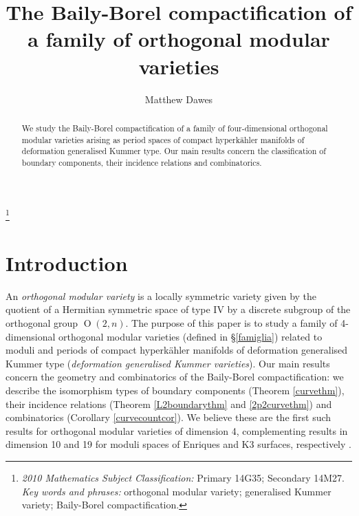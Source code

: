 \documentclass[11pt]{article}
\title{The Baily-Borel compactification of a family of orthogonal modular varieties}
\author{Matthew Dawes}
\date{}
\newcommand{\opn}{\operatorname}
\begin{document}
\maketitle
\def\thefootnote{}
\footnote{\textit{2010 Mathematics Subject Classification:}
Primary 14G35; Secondary 14M27. \\
\textit{Key words and phrases:}
orthogonal modular variety; generalised Kummer variety; Baily-Borel compactification.}
\begin{abstract}
  We study the Baily-Borel compactification of a family of four-dimensional orthogonal modular varieties
  arising as period spaces of compact hyperk\"ahler manifolds of deformation generalised Kummer type.
  Our main results concern the classification of boundary components, their incidence relations and combinatorics.
\end{abstract}
\section{Introduction}
An \emph{orthogonal modular variety} is a locally symmetric variety
given by the quotient of a Hermitian symmetric space of type IV by a discrete subgroup of the orthogonal group
$\opn{O}(2, n)$.
The purpose of this paper is to study a family of 4-dimensional
orthogonal modular varieties (defined in \S\ref{famiglia}) related to moduli and periods of   compact
hyperk\"ahler manifolds of deformation generalised Kummer
type (\emph{deformation generalised Kummer varieties}).
Our main results concern the geometry and  combinatorics of the Baily-Borel compactification:
we describe the isomorphism types of boundary components (Theorem \ref{curvethm}), their incidence relations (Theorem \ref{L2boundarythm} and \ref{2p2curvethm}) and combinatorics (Corollary \ref{curvecountcor}).
We believe these are the first such results for orthogonal modular varieties of dimension 4, complementing results in dimension 10 and 19 for moduli spaces of Enriques and K3 surfaces, respectively \cite{Sterk, Scattone}.
\end{document}
